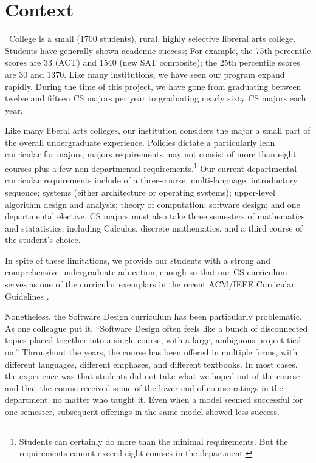 \section{Context}

\college\ College is a small (1700 students), rural, highly selective
libreral arts college.  Students have generally shown academic
success; For example, the 75th percentile scores are 33 (ACT) and
1540 (new SAT composite); the 25th percentile scores are 30 and
1370.  Like many institutions, we have seen our program expand
rapidly.  During the time of this project, we have gone from
graduating between twelve and fifteen CS majors per year to graduating
nearly sixty CS majors each year.

Like many liberal arts colleges, our institution considers the major a
small part of the overall undergraduate experience.  Policies dictate
a particularly lean curricular for majors; majors requirements may
not consist of more than eight courses plus a few non-departmental
requirements.\footnote{Students can certainly do more than the
minimal requirements.  But the requirements cannot exceed eight
courses in the department.} Our current departmental curricular
requirements include of a three-course, multi-language, introductory
sequence; systems (either architecture or operating systems);
upper-level algorithm design and analysis; theory of computation;
software design; and one departmental elective.  CS majors must
also take three semesters of mathematics and statatistics, including
Calculus, discrete mathematics, and a third course of the student's
choice.  

In spite of these limitations, we provide our students with a strong
and comprehensive undergraduate aducation, enough so that our
CS curriculum serves as one of the curricular exemplars in the
recent ACM/IEEE Curricular Guidelines \cite{curriclum-2013}.

Nonetheless, the Software Design curriculum has been particularly
problematic.  As one colleague put it, ``Software Design often feels
like a bunch of disconnected topics placed together into a single
course, with a large, ambiguous project tied on.''  Throughout the
years, the course has been offered in multiple forms, with different
languages, different emphases, and different textbooks.  In most
cases, the experience was that students did not take what we hoped
out of the course and that the course received some of the lower
end-of-course ratings in the department, no matter who taught it.
Even when a model seemed successful for one semester, subsequent
offerings in the same model showed less success.

